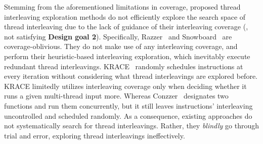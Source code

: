 







%
Stemming from the aforementioned limitations in coverage, proposed
thread interleaving exploration methods do not efficiently explore the
search space of thread interleaving due to the lack of guidance of
their interleaving coverage (\ie, not satisfying \textbf{Design goal
  2}).
%
Specifically, Razzer~\cite{razzer} and Snowboard~\cite{snowboard} are
coverage-oblivious.  They do not make use of any interleaving
coverage, and perform their heuristic-based interleaving exploration,
which inevitably execute redundant thread interleavings.
%
KRACE~\cite{krace} randomly schedules instructions at every iteration
without considering what thread interleavings are explored before.
KRACE limitedly utilizes interleaving coverage only when deciding
whether it runs a given multi-thread input more.\dr{}
%
Whereas Conzzer~\cite{conzzer} designates two functions and run them
concurrently, but it still leaves instructions' interleaving
uncontrolled and scheduled randomly.
%
As a consequence, existing approaches do not systematically search for
thread interleavings.  Rather, they \textit{blindly} go through
trial and error, exploring thread interleavings ineffectively.

